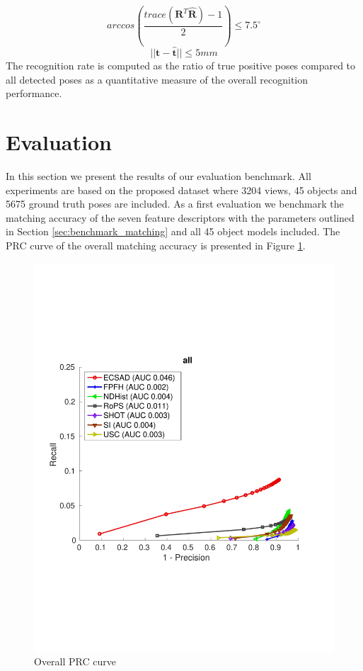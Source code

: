 \documentclass[10pt,twocolumn,letterpaper]{article}
\begin{document}
\begin{equation}\label{eq::rot}
arccos \left(\frac{trace(\textbf{R}^{T}\hat{\textbf{R}})-1}{2}\right) \leq 7.5^\circ
\end{equation}
\begin{equation}\label{eq::trans}
||\textbf{t} - \hat{\textbf{t}} || \leq 5mm
\end{equation}
The recognition rate is computed as the ratio of true positive poses compared to all detected poses as a quantitative measure of the overall recognition performance.
\section{Evaluation}\label{sec:evaluation}
In this section we present the results of our evaluation benchmark. All experiments are based on the proposed dataset where 3204 views, 45 objects and 5675 ground truth poses are included. As a first evaluation we benchmark the matching accuracy of the seven feature descriptors with the parameters outlined in Section \ref{sec:benchmark_matching} and all 45 object models included. The PRC curve of the overall matching accuracy is presented in Figure \ref{fig:all_L2_RATIO_zoom}.   
\begin{figure}[h]
\includegraphics[clip, trim=0.7cm 6cm 0.7cm 6cm,width=1.0\linewidth, height= 1.0\linewidth, keepaspectratio]{img/all_L2_RATIO_zoom.pdf} 
\caption{Overall PRC curve}\label{fig:all_L2_RATIO_zoom}
\end{figure}
\end{document}
